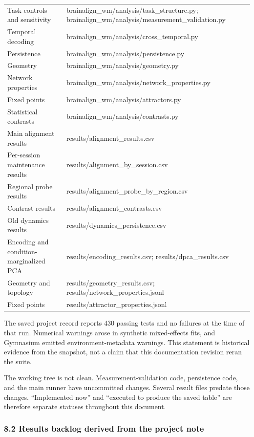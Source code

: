 \documentclass[
  10pt,
]{article}
\begin{document}
\begin{longtable}[]{@{}
  >{\raggedright\arraybackslash}p{}
  >{\raggedright\arraybackslash}p{}@{}}
Task controls and sensitivity &
brainalign\_wm/analysis/task\_structure.py;
brainalign\_wm/analysis/measurement\_validation.py \\
Temporal decoding & brainalign\_wm/analysis/cross\_temporal.py \\
Persistence & brainalign\_wm/analysis/persistence.py \\
Geometry & brainalign\_wm/analysis/geometry.py \\
Network properties & brainalign\_wm/analysis/network\_properties.py \\
Fixed points & brainalign\_wm/analysis/attractors.py \\
Statistical contrasts & brainalign\_wm/analysis/contrasts.py \\
Main alignment results & results/alignment\_results.csv \\
Per-session maintenance results & results/alignment\_by\_session.csv \\
Regional probe results & results/alignment\_probe\_by\_region.csv \\
Contrast results & results/alignment\_contrasts.csv \\
Old dynamics results & results/dynamics\_persistence.csv \\
Encoding and condition-marginalized PCA & results/encoding\_results.csv;
results/dpca\_results.csv \\
Geometry and topology & results/geometry\_results.csv;
results/network\_properties.jsonl \\
Fixed points & results/attractor\_properties.jsonl \\
\end{longtable}

The saved project record reports 430 passing tests and no failures at
the time of that run. Numerical warnings arose in synthetic
mixed-effects fits, and Gymnasium emitted environment-metadata warnings.
This statement is historical evidence from the snapshot, not a claim
that this documentation revision reran the suite.

The working tree is not clean. Measurement-validation code, persistence
code, and the main runner have uncommitted changes. Several result files
predate those changes. ``Implemented now'' and ``executed to produce the
saved table'' are therefore separate statuses throughout this document.

\hypertarget{results-backlog-derived-from-the-project-note}{%
\subsubsection{8.2 Results backlog derived from the project
note}\label{results-backlog-derived-from-the-project-note}}
\end{document}
